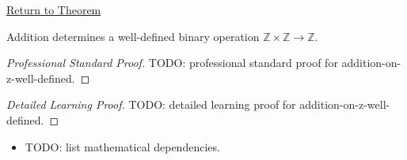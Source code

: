 \newpage
{}
\label{prf:addition-on-z-well-defined}

\begin{remark*}[Return]
\hyperref[thm:addition-on-z-well-defined]{Return to Theorem}
\end{remark*}

\begin{theorem*}
Addition determines a well-defined binary operation
$\mathbb{Z}\times\mathbb{Z}\to\mathbb{Z}$.
\end{theorem*}

\begin{proof}[Professional Standard Proof]
\LRAProofBodyStart
TODO: professional standard proof for addition-on-z-well-defined.
\end{proof}

\begin{proof}[Detailed Learning Proof]
\LRAProofBodyStart
TODO: detailed learning proof for addition-on-z-well-defined.
\end{proof}

\begin{remark*}
\end{remark*}

\begin{dependencies}
\begin{itemize}
  \item TODO: list mathematical dependencies.
\end{itemize}
\end{dependencies}

\clearpage
